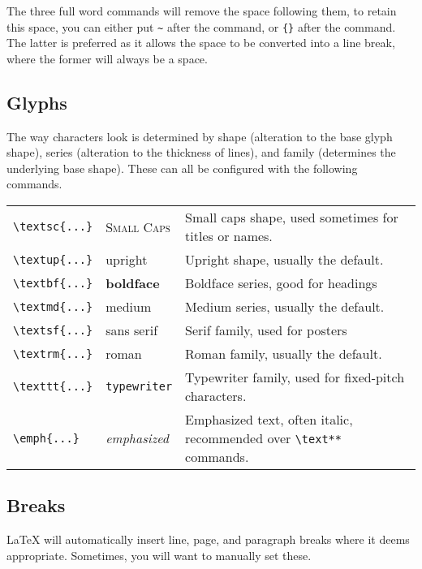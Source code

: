The three full word commands will remove the space following them, to retain this space, you can either put \verb|~| after the command, or \verb|{}| after the command. The latter is preferred as it allows the space to be converted into a line break, where the former will always be a space.


\subsection*{Glyphs}

The way characters look is determined by shape (alteration to the base glyph shape), series (alteration to the thickness of lines), and family (determines the underlying base shape). These can all be configured with the following commands.

\begin{tabular}{lll}
    \verb|\textsc{...}| & \textsc{Small Caps} & Small caps shape, used sometimes for titles or names. \\
    \verb|\textup{...}| & \textup{upright} & Upright shape, usually the default. \\[2ex]
    \verb|\textbf{...}| & \textbf{boldface} & Boldface series, good for headings \\
    \verb|\textmd{...}| & \textmd{medium} & Medium series, usually the default. \\[2ex]
    \verb|\textsf{...}| & \textsf{sans serif} & Serif family, used for posters \\
    \verb|\textrm{...}| & \textrm{roman} & Roman family, usually the default. \\
    \verb|\texttt{...}| & \texttt{typewriter} & Typewriter family, used for fixed-pitch characters. \\[2ex]
    \verb|\emph{...}| & \emph{emphasized} & Emphasized text, often italic, recommended over \verb|\text**| commands.
\end{tabular}

\subsection*{Breaks}

\LaTeX{} will automatically insert line, page, and paragraph breaks where it deems appropriate. Sometimes, you will want to manually set these.


